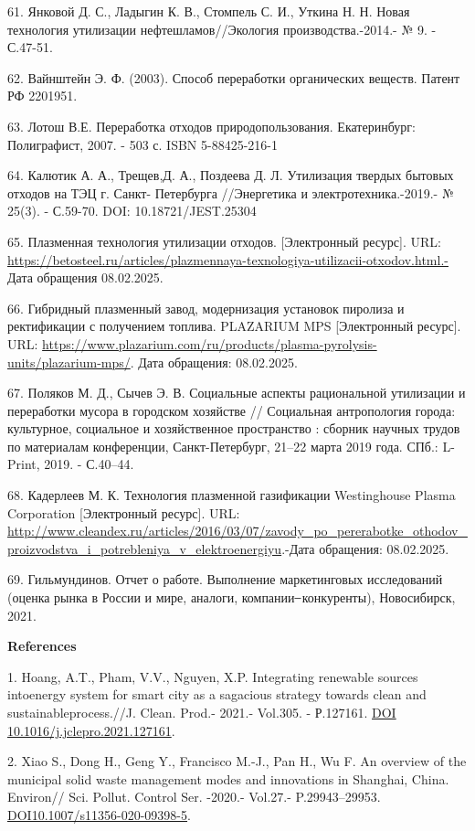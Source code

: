 61. Янковой Д. С., Ладыгин К. В., Стомпель С. И., Уткина Н. Н. Новая
технология утилизации нефтеш­ламов//Экология производства.-2014.- № 9. -
С.47-51.

62. Вайнштейн Э. Ф. (2003). Способ переработки органических веществ.
Патент РФ 2201951.

63. Лотош В.Е. Переработка отходов природопользования. Екатеринбург:
Полиграфист, 2007. - 503 с. ISBN 5-88425-216-1

64. Калютик А. А., Трещев,Д. А., Поздеева Д. Л. Утилизация твердых
бытовых отходов на ТЭЦ г. Санкт- Петербурга //Энергетика и
электротехника.-2019.- № 25(3). - С.59-70. DOI: 10.18721/JEST.25304

65. Плазменная технология утилизации отходов. {[}Электронный ресурс{]}.
URL:
\url{https://betosteel.ru/articles/plazmennaya-texnologiya-utilizacii-otxodov.html.-}
Дата обращения 08.02.2025.

66. Гибридный плазменный завод, модернизация установок пиролиза и
ректификации с получением топлива. PLAZARIUM MPS {[}Электронный
ресурс{]}. URL:
\url{https://www.plazarium.com/ru/products/plasma-pyrolysis-units/plazarium-mps/}.
Дата обращения: 08.02.2025.

67. Поляков М. Д., Сычев Э. В. Социальные аспекты рациональной
утилизации и переработки мусора в городском хозяйстве // Социальная
антропология города: культурное, социальное и хозяйственное пространство
: сборник научных трудов по материалам конференции, Санкт-Петербург,
21--22 марта 2019 года. СПб.: L-Print, 2019. - С.40--44.

68. Кадерлеев М. К. Технология плазменной газификации Westinghouse
Plasma Corporation {[}Электронный ресурс{]}. URL:
\url{http://www.cleandex.ru/articles/2016/03/07/zavody_po_pererabotke_othodov_proizvodstva_i_potrebleniya_v_elektroenergiyu}.-Дата
обращения: 08.02.2025.

69. Гильмундинов. Отчет о работе. Выполнение маркетинговых исследований
(оценка рынка в России и мире, аналоги, компании ̶ конкуренты),
Новосибирск, 2021.

{\bfseries References}

1. Hoang, A.T., Pham, V.V., Nguyen, X.P. Integrating renewable sources
intoenergy system for smart city as a sagacious strategy towards clean
and sustainableprocess.//J. Clean. Prod.- 2021.- Vol.305. - Р.127161.
\href{https://doi.org/10.1016/j.jclepro.2021.127161}{DOI
10.1016/j.jclepro.2021.127161}.

2. Xiao S., Dong H., Geng Y., Francisco M.-J., Pan H., Wu F. An overview
of the municipal solid waste management modes and innovations in
Shanghai, China. Environ// Sci. Pollut. Control Ser. -2020.- Vol.27.-
P.29943--29953.
\href{https://doi.org/10.1007/s11356-020-09398-5}{DOI10.1007/s11356-020-09398-5}.

